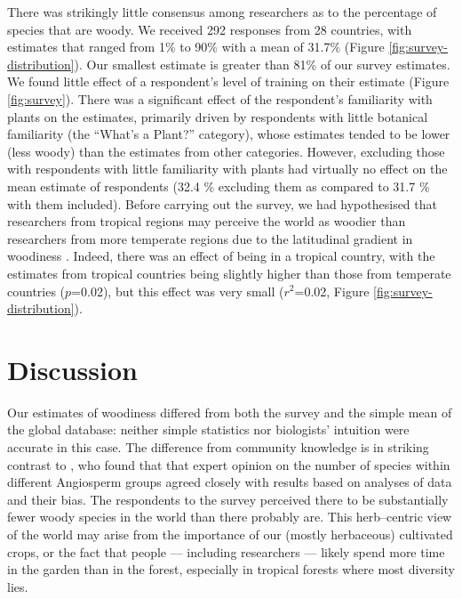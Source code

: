 \documentclass[a4paper,12pt]{article}
\begin{document}
There was strikingly little consensus among researchers as to the
percentage of species that are woody.  We received 292 responses from
28 countries, with estimates that ranged from 1\% to 90\% with a mean
of 31.7\% (Figure \ref{fig:survey-distribution}).  Our smallest
estimate is greater than 81\% of our survey estimates.
%
%
We found little effect of a respondent's level of training on their
estimate (Figure \ref{fig:survey}).  There was a significant effect of
the respondent's familiarity with plants on the estimates, primarily
driven by respondents with little botanical familiarity (the ``What's
a Plant?'' category), whose estimates tended to be lower (less woody)
than the estimates from other categories. However, excluding those with
respondents with little familiarity with plants had virtually no effect
on the mean estimate of respondents (32.4 \% excluding them as compared
to 31.7 \% with them included).
%
Before carrying out the survey, we had hypothesised that researchers
from tropical regions may perceive the world as woodier than
researchers from more temperate regions due to the latitudinal
gradient in woodiness \citep{Molesheihgt}.
%
Indeed, there was an effect of being in a tropical country, with the
estimates from tropical countries being slightly higher than those
from temperate countries ($p$=0.02), but this effect was very small
($r^2$=0.02, Figure \ref{fig:survey-distribution}).




\section{Discussion}

Our estimates of woodiness differed from both the survey and the
simple mean of the global database: neither simple statistics nor
biologists' intuition were accurate in this case.  The difference from
community knowledge is in striking contrast to \citet{joppa2010}, who
found that that expert opinion on the number of species within
different Angiosperm groups agreed closely with results based on
analyses of data and their bias.
The respondents to the survey perceived there to be substantially fewer woody
species in the world than there probably are.  This herb--centric view
of the world may arise from the importance of our (mostly herbaceous)
cultivated crops, or the fact that people --- including researchers
--- likely spend more time in the garden than in the forest, especially in tropical forests where most diversity lies.
\end{document}
